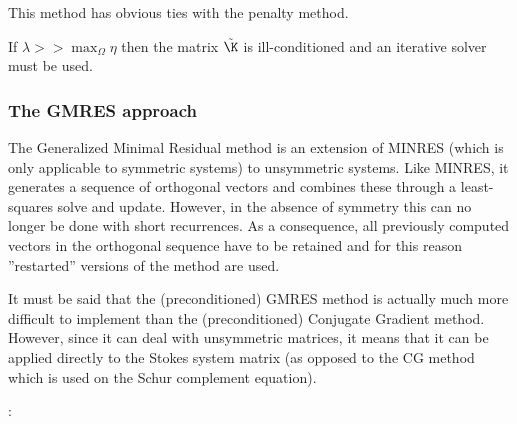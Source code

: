 \begin{remark} 
This method has obvious ties with the penalty method. 
\end{remark}

\begin{remark} 
If $\lambda >> \max_\Omega{\eta}$ then the matrix $\tilde{\K}$ is ill-conditioned and an iterative solver must be used.
\end{remark}




\subsubsection{The GMRES approach}

The Generalized Minimal Residual method \cite{sasc86} 
is an extension of MINRES (which is only applicable to symmetric systems) to unsymmetric systems. 
Like MINRES, it generates a sequence of orthogonal vectors and 
combines these through a least-squares solve and update. However, 
in the absence of symmetry this can no longer be done with short recurrences. As a consequence, 
all previously computed vectors in the orthogonal sequence have to be retained and 
for this reason ''restarted'' versions of the method are used.

It must be said that the (preconditioned) GMRES method is actually much more difficult to implement 
than the (preconditioned) Conjugate Gradient method.
However, since it can deal with unsymmetric matrices, it means that it can be applied 
directly to the Stokes system matrix (as opposed to the CG method which is used on the Schur complement
equation).

 

\Literature: \cite[p208]{eijkhout} \cite{saad,saad93} \cite{babc94} \cite{ayac03}







